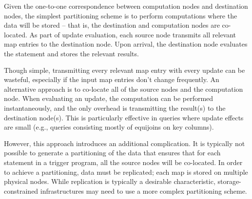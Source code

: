 Given the one-to-one correspondence between computation nodes and destination nodes, the simplest partitioning scheme is to perform computations where the data will be stored -- that is, the destination and computation nodes are co-located.  As part of update evaluation, each source node transmits all relevant map entries to the destination node.  Upon arrival, the destination node evaluates the statement and stores the relevant results.

Though simple, transmitting every relevant map entry with every update can be wasteful, especially if the input map entries don't change frequently.  An alternative approach is to co-locate all of the source nodes and the computation node.  When evaluating an update, the computation can be performed instantaneously, and the only overhead is transmitting the result(s) to the destination node(s).  This is particularly effective in queries where update effects are small (e.g., queries consisting mostly of equijoins on key columns).

However, this approach introduces an additional complication.  It is typically not possible to generate a partitioning of the data that ensures that for each statement in a trigger program, all the source nodes will be co-located.  In order to achieve a partitioning, data must be replicated; each map is stored on multiple physical nodes.  While replication is typically a desirable characteristic, storage-constrained infrastructures may need to use a more complex partitioning scheme.

